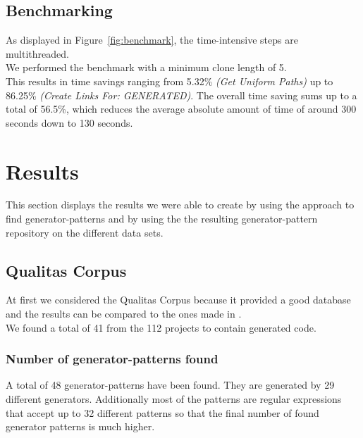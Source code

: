 \subsection{Benchmarking}
\label{section:benchmark}
As displayed in Figure~\ref{fig:benchmark}, the time-intensive steps are multithreaded.\\
We performed the benchmark with a minimum clone length of 5.\\
This results in time savings ranging from 5.32\% \textit{(Get Uniform Paths)} up to 86.25\% \textit{(Create Links For: GENERATED)}. The overall time saving sums up to a total of 56.5\%, which reduces the average absolute amount of time of around 300 seconds down to 130 seconds. 



\section{Results}
This section displays the results we were able to create by using the approach to find generator-patterns and by using the the resulting generator-pattern repository on the different data sets. 
\subsection{Qualitas Corpus}
At first we considered the Qualitas Corpus because it provided a good database and the results can be compared to the ones made in \cite{Bernwieser2014}.\\
We found a total of 41 from the 112 projects to contain generated code. 

\subsubsection{Number of generator-patterns found}
A total of 48 generator-patterns have been found. They are generated by 29 different generators. Additionally most of the patterns are regular expressions that accept up to 32 different patterns so that the final number of found generator patterns is much higher.

%
